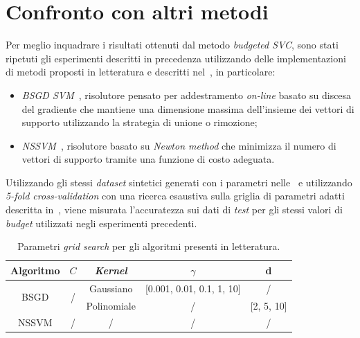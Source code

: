 \section{Confronto con altri metodi}\label{sec:comparazione_metodi}
Per meglio inquadrare i risultati ottenuti dal metodo \emph{budgeted SVC}, sono stati ripetuti gli esperimenti descritti in precedenza utilizzando delle implementazioni di metodi proposti in letteratura e descritti nel~, in particolare:
\begin{itemize}
    \item \emph{BSGD SVM}~\cite{2012_bsgd}, risolutore pensato per addestramento \emph{on-line} basato su discesa del gradiente che mantiene una dimensione massima dell'insieme dei vettori di supporto utilizzando la strategia di unione o rimozione;
    \item \emph{NSSVM}~\cite{2020_sparse_svm}, risolutore basato su \emph{Newton method} che minimizza il numero di vettori di supporto tramite una funzione di costo adeguata.
\end{itemize}
Utilizzando gli stessi \emph{dataset} sintetici generati con i parametri nelle~ e utilizzando \emph{5-fold cross-validation} con una ricerca esaustiva sulla griglia di parametri adatti descritta in~, viene misurata l'accuratezza sui dati di \emph{test} per gli stessi valori di \emph{budget} utilizzati negli esperimenti precedenti.
\begin{table}
    \centering
    \begin{tabular}{ccccc}
        \toprule
        Algoritmo & $C$ & \emph{Kernel} & $\gamma$ & d \\
        \midrule
        \multirow{2}{*}{BSGD}   & \multirow{2}{*}{/}  & Gaussiano   & [0.001, 0.01, 0.1, 1, 10]   & /\\
                                      \cline{3-5}
                                &   & Polinomiale & / & [2, 5, 10] \\
        \hline
        NSSVM   & / & / & / & / \\
        \bottomrule
    \end{tabular}
    \caption{Parametri \emph{grid search} per gli algoritmi presenti in letteratura.}
    \label{tab:gridsearch_comparazioni}
\end{table}
